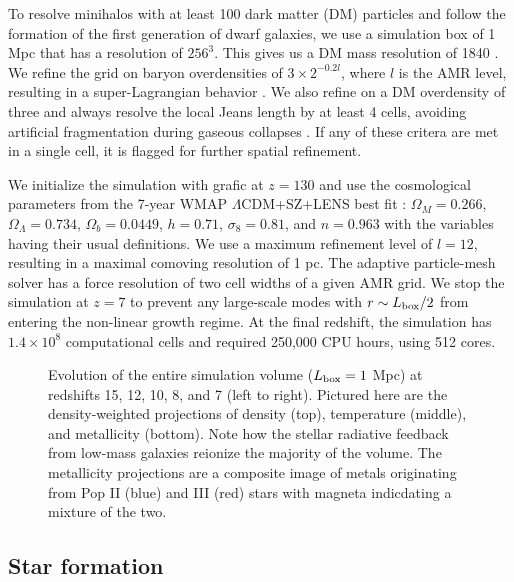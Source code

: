 \documentclass[apjl]{emulateapj}
\begin{document}
To resolve minihalos with at least 100 dark matter (DM) particles and
follow the formation of the first generation of dwarf galaxies, we use
a simulation box of 1 Mpc that has a resolution of $256^3$.  This
gives us a DM mass resolution of 1840 \Ms.  We refine the grid on
baryon overdensities of $3 \times 2^{-0.2l}$, where $l$ is the AMR
level, resulting in a super-Lagrangian behavior \citep[also
  see][]{OShea08}.  We also refine on a DM overdensity of three and
always resolve the local Jeans length by at least 4 cells, avoiding
artificial fragmentation during gaseous collapses \citep{Truelove97}.
If any of these critera are met in a single cell, it is flagged for
further spatial refinement.

We initialize the simulation with grafic \citep{Bertschinger01} at $z
= 130$ and use the cosmological parameters from the 7-year WMAP
$\Lambda$CDM+SZ+LENS best fit \citep{WMAP7}: $\Omega_M = 0.266$,
$\Omega_\Lambda = 0.734$, $\Omega_b = 0.0449$, $h = 0.71$, $\sigma_8 =
0.81$, and $n = 0.963$ with the variables having their usual
definitions.  We use a maximum refinement level of $l = 12$, resulting
in a maximal comoving resolution of 1 pc.  The adaptive particle-mesh
solver has a force resolution of two cell widths of a given AMR grid.
We stop the simulation at $z=7$ to prevent any large-scale modes with
$r \sim L_{\rm box}/2$ from entering the non-linear growth regime.  At
the final redshift, the simulation has $1.4 \times 10^8$ computational
cells and required 250,000 CPU hours, using 512 cores.


\begin{figure*}
  \caption{\label{fig:evo-mosaic} Evolution of the entire simulation
    volume ($L_{\rm box} = 1$ Mpc) at redshifts 15, 12, 10, 8, and 7
    (left to right).  Pictured here are the density-weighted
    projections of density (top), temperature (middle), and
    metallicity (bottom).  Note how the stellar radiative feedback
    from low-mass galaxies reionize the majority of the volume.  The
    metallicity projections are a composite image of metals
    originating from Pop II (blue) and III (red) stars with magneta
    indicdating a mixture of the two.}
\end{figure*}


\subsection{Star formation}
\end{document}
